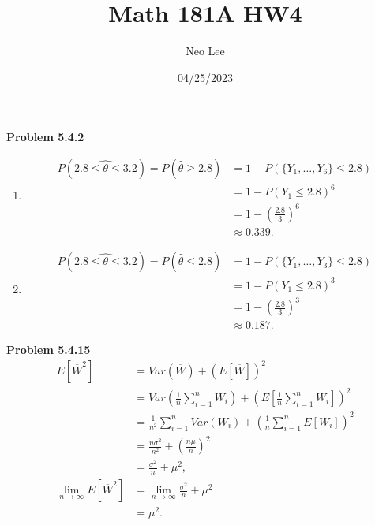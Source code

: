 \documentclass{article}
\title{Math 181A HW4}
\author{Neo Lee}
\date{04/25/2023}
\begin{document}
 

\maketitle 

\textbf{Problem 5.4.2}
\begin{enumerate}[label={(\alph*)}]
    \item \begin{align}
        P(\hat{2.8\le \theta\le 3.2}) = P(\hat{\theta} \ge 2.8) & = 1-P(\{Y_1, \dots, Y_6\}\le 2.8) \nonumber \\
        & = 1 - P(Y_1\le 2.8)^6 \nonumber \\
        & = 1 - \left(\frac{2.8}{3}\right)^6 \nonumber \\
        & \approx 0.339. \nonumber
    \end{align}

    \item 
    \begin{align}
        P(\hat{2.8\le \theta\le 3.2}) = P(\hat{\theta} \le 2.8) & = 1- P(\{Y_1, \dots, Y_3\}\le 2.8) \nonumber \\
        & = 1 - P(Y_1\le 2.8)^3 \nonumber \\
        & = 1 - \left(\frac{2.8}{3}\right)^3 \nonumber \\
        & \approx 0.187. \nonumber
    \end{align}
\end{enumerate}
\bigbreak


\textbf{Problem 5.4.15}
\begin{align}
    E[\overline{W}^2] & = Var(\overline{W}) + (E[\overline{W}])^2 \nonumber \\
    & = Var(\frac{1}{n}\sum_{i=1}^{n}W_i) + \left(E[\frac{1}{n}\sum_{i=1}^{n}W_i]\right)^2 \nonumber \\
    & = \frac{1}{n^2}\sum_{i=1}^{n}Var(W_i) + \left(\frac{1}{n}\sum_{i=1}^{n}E[W_i]\right)^2 \nonumber \\
    & = \frac{n\sigma^2}{n^2} + \left(\frac{n\mu}{n}\right)^2 \nonumber \\
    & = \frac{\sigma^2}{n} + \mu^2, \nonumber \\
    \lim_{n\to\infty}E[\overline{W}^2] & = \lim_{n\to\infty}\frac{\sigma^2}{n} + \mu^2 \nonumber \\
    & = \mu^2. \nonumber
\end{align}
\bigbreak
\end{document}
